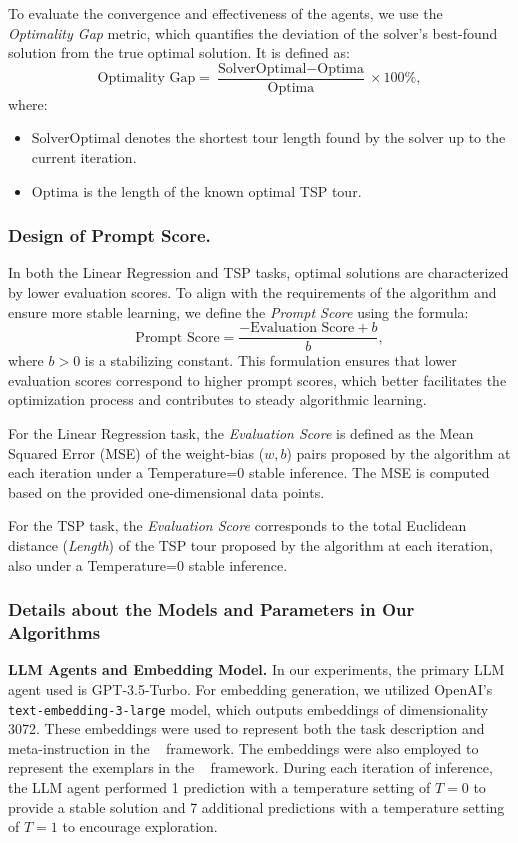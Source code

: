 To evaluate the convergence and effectiveness of the agents, we use the \textit{Optimality Gap} metric, which quantifies the deviation of the solver's best-found solution from the true optimal solution. It is defined as:
\[
\text{Optimality Gap} = \frac{\text{SolverOptimal} - \text{Optima}}{\text{Optima}} \times 100\%,
\]
where:
\begin{itemize}
    \item \(\text{SolverOptimal}\) denotes the shortest tour length found by the solver up to the current iteration.
    \item \(\text{Optima}\) is the length of the known optimal TSP tour.
\end{itemize}


\subsubsection{Design of Prompt Score.}
In both the Linear Regression and TSP tasks, optimal solutions are characterized by lower evaluation scores. To align with the requirements of the algorithm and ensure more stable learning, we define the \textit{Prompt Score} using the formula:
\[
\text{Prompt Score} = \frac{-\text{Evaluation Score} + b}{b},
\]
where \(b > 0\) is a stabilizing constant. This formulation ensures that lower evaluation scores correspond to higher prompt scores, which better facilitates the optimization process and contributes to steady algorithmic learning.

For the Linear Regression task, the \textit{Evaluation Score} is defined as the Mean Squared Error (MSE) of the weight-bias (\(w, b\)) pairs proposed by the algorithm at each iteration under a Temperature=0 stable inference. The MSE is computed based on the provided one-dimensional data points.

For the TSP task, the \textit{Evaluation Score} corresponds to the total Euclidean distance (\textit{Length}) of the TSP tour proposed by the algorithm at each iteration, also under a Temperature=0 stable inference.


\subsubsection{Details about the Models and Parameters in Our Algorithms}

\textbf{LLM Agents and Embedding Model.}
In our experiments, the primary LLM agent used is GPT-3.5-Turbo.
For embedding generation, we utilized OpenAI's \texttt{text-embedding-3-large} model, which outputs embeddings of dimensionality 3072. These embeddings were used to represent both the task description and meta-instruction in the \alg~ framework. The embeddings were also employed to represent the exemplars in the \alges~ framework. During each iteration of inference, the LLM agent performed 1 prediction with a temperature setting of \(T=0\) to provide a stable solution and 7 additional predictions with a temperature setting of \(T=1\) to encourage exploration.

